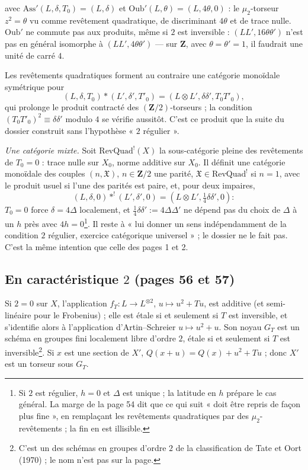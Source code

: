 \documentclass[11pt,a4paper]{article}
\begin{document}
avec $\mathrm{Ass}'(L, \delta, T_0) = (L, \delta)$ et $\mathrm{Oub}'(L, \theta) = (L, 4\theta, 0)$ :
le $\mu_2$-torseur $z^{2} = \theta$ vu comme revêtement quadratique, de discriminant
$4\theta$ et de trace nulle. $\mathrm{Oub}'$ ne commute pas aux produits, même si $2$
est inversible : $(LL', 16\theta\theta')$ n'est pas en général isomorphe à
$(LL', 4\theta\theta')$ --- sur $\mathbf{Z}$, avec $\theta = \theta' = 1$, il faudrait une
unité de carré $4$.

Les revêtements quadratiques forment au contraire une catégorie monoïdale
symétrique pour
\[
  (L, \delta, T_0) * (L', \delta', T'_0) = (L \otimes L', \delta\delta', T_0T'_0),
\]
qui prolonge le produit contracté des $(\mathbf{Z}/2)$-torseurs ; la condition
$(T_0T'_0)^{2} \equiv \delta\delta'$ modulo $4$ se vérifie aussitôt. C'est ce produit que
la suite du dossier construit sans l'hypothèse « $2$ régulier ».

\emph{Une catégorie mixte.} Soit $\mathrm{RevQuad}^{!}(X)$ la sous-catégorie pleine des
revêtements de $T_0 = 0$ : trace nulle sur $X_0$, norme additive sur $X_0$. Il
définit une catégorie monoïdale des couples $(n, \mathfrak{X})$, $n \in \mathbf{Z}/2$ une
parité, $\mathfrak{X} \in \mathrm{RevQuad}^{!}$ si $n = 1$, avec le produit usuel si
l'une des parités est paire, et, pour deux impaires,
\[
  (L, \delta, 0) *^{!} (L', \delta', 0) = (L \otimes L', \tfrac{1}{4}\delta\delta', 0) :
\]
$T_0 = 0$ force $\delta = 4\Delta$ localement, et $\tfrac{1}{4}\delta\delta' := 4\Delta\Delta'$ ne
dépend pas du choix de $\Delta$ à un $h$ près avec $4h = 0$\footnote{Si $2$ est
régulier, $h = 0$ et $\Delta$ est unique ; la latitude en $h$ prépare le cas
général. La marge de la page 54 dit que ce qui suit « doit être repris de façon
plus fine », en remplaçant les revêtements quadratiques par des
$\mu_2$-revêtements ; la fin en est illisible.}. Il reste à « lui donner un sens
indépendamment de la condition $2$ régulier, exercice catégorique universel » ;
le dossier ne le fait pas. C'est la même intention que celle des pages 1 et 2.

\subsection*{En caractéristique $2$ (pages 56 et 57)}

Si $2 = 0$ sur $X$, l'application $f_T : L \to L^{\otimes 2}$, $u \mapsto u^{2} + Tu$,
est additive (et semi-linéaire pour le Frobenius) ; elle est étale si et seulement
si $T$ est inversible, et s'identifie alors à l'application d'Artin--Schreier
$u \mapsto u^{2} + u$. Son noyau $G_T$ est un schéma en groupes fini localement
libre d'ordre $2$, étale si et seulement si $T$ est inversible\footnote{C'est un
des schémas en groupes d'ordre $2$ de la classification de Tate et Oort (1970) ;
le nom n'est pas sur la page.}. Si $x$ est une section de $X'$, $Q(x + u) = Q(x) +
u^{2} + Tu$ ; donc $X'$ est un torseur sous $G_T$.
\end{document}
